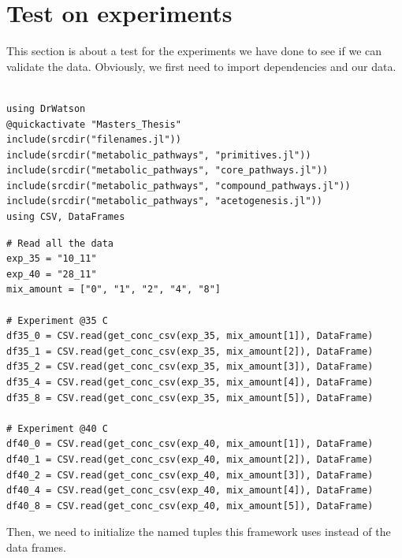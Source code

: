 \documentclass[11pt]{article}
\begin{document}
\section{Test on experiments}
\label{sec:orgecc675b}
This section is about a test for the experiments we have done to see if we can validate the data. Obviously, we first need to import dependencies and our data.

\begin{verbatim}

using DrWatson
@quickactivate "Masters_Thesis"
include(srcdir("filenames.jl"))
include(srcdir("metabolic_pathways", "primitives.jl"))
include(srcdir("metabolic_pathways", "core_pathways.jl"))
include(srcdir("metabolic_pathways", "compound_pathways.jl"))
include(srcdir("metabolic_pathways", "acetogenesis.jl"))
using CSV, DataFrames

\end{verbatim}

\begin{verbatim}
# Read all the data
exp_35 = "10_11"
exp_40 = "28_11"
mix_amount = ["0", "1", "2", "4", "8"]

# Experiment @35 C
df35_0 = CSV.read(get_conc_csv(exp_35, mix_amount[1]), DataFrame)
df35_1 = CSV.read(get_conc_csv(exp_35, mix_amount[2]), DataFrame)
df35_2 = CSV.read(get_conc_csv(exp_35, mix_amount[3]), DataFrame)
df35_4 = CSV.read(get_conc_csv(exp_35, mix_amount[4]), DataFrame)
df35_8 = CSV.read(get_conc_csv(exp_35, mix_amount[5]), DataFrame)

# Experiment @40 C
df40_0 = CSV.read(get_conc_csv(exp_40, mix_amount[1]), DataFrame)
df40_1 = CSV.read(get_conc_csv(exp_40, mix_amount[2]), DataFrame)
df40_2 = CSV.read(get_conc_csv(exp_40, mix_amount[3]), DataFrame)
df40_4 = CSV.read(get_conc_csv(exp_40, mix_amount[4]), DataFrame)
df40_8 = CSV.read(get_conc_csv(exp_40, mix_amount[5]), DataFrame)

\end{verbatim}

Then, we need to initialize the named tuples this framework uses instead of the data frames.
\end{document}
